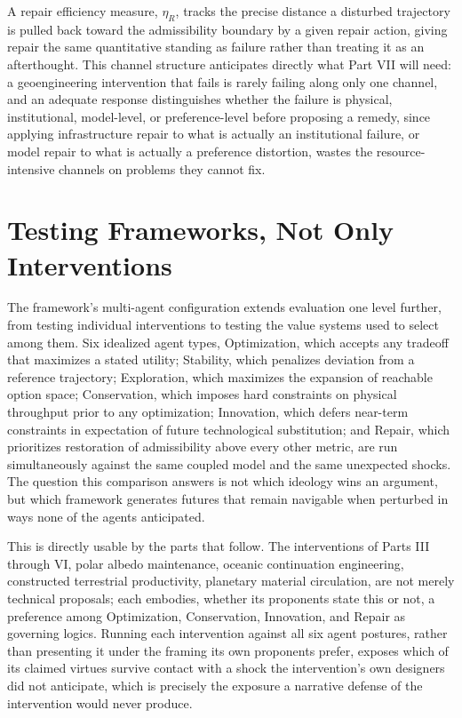 \documentclass[11pt,oneside]{book}
\begin{document}
A repair efficiency measure, $\eta_R$, tracks the precise distance a disturbed trajectory is pulled back toward the admissibility boundary by a given repair action, giving repair the same quantitative standing as failure rather than treating it as an afterthought. This channel structure anticipates directly what Part VII will need: a geoengineering intervention that fails is rarely failing along only one channel, and an adequate response distinguishes whether the failure is physical, institutional, model-level, or preference-level before proposing a remedy, since applying infrastructure repair to what is actually an institutional failure, or model repair to what is actually a preference distortion, wastes the resource-intensive channels on problems they cannot fix.

\section*{Testing Frameworks, Not Only Interventions}

The framework's multi-agent configuration extends evaluation one level further, from testing individual interventions to testing the value systems used to select among them. Six idealized agent types, Optimization, which accepts any tradeoff that maximizes a stated utility; Stability, which penalizes deviation from a reference trajectory; Exploration, which maximizes the expansion of reachable option space; Conservation, which imposes hard constraints on physical throughput prior to any optimization; Innovation, which defers near-term constraints in expectation of future technological substitution; and Repair, which prioritizes restoration of admissibility above every other metric, are run simultaneously against the same coupled model and the same unexpected shocks. The question this comparison answers is not which ideology wins an argument, but which framework generates futures that remain navigable when perturbed in ways none of the agents anticipated.

This is directly usable by the parts that follow. The interventions of Parts III through VI, polar albedo maintenance, oceanic continuation engineering, constructed terrestrial productivity, planetary material circulation, are not merely technical proposals; each embodies, whether its proponents state this or not, a preference among Optimization, Conservation, Innovation, and Repair as governing logics. Running each intervention against all six agent postures, rather than presenting it under the framing its own proponents prefer, exposes which of its claimed virtues survive contact with a shock the intervention's own designers did not anticipate, which is precisely the exposure a narrative defense of the intervention would never produce.
\end{document}
